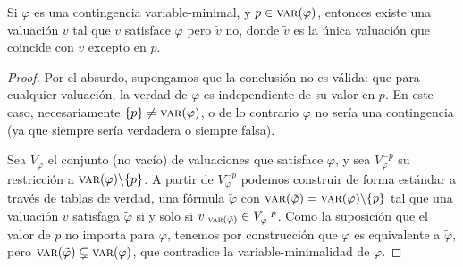 \begin{lemma} \label{lemma:variableMinimalProp}
Si $\varphi$ es una contingencia variable-minimal, y $p \in \textsc{var}(\varphi)$, entonces existe una valuación $v$ tal que $v$ satisface $\varphi$ pero $\tilde{v}$ no, donde $\tilde{v}$ es la única valuación que coincide con $v$ excepto en $p$.
\end{lemma}
\begin{proof}

Por el absurdo, supongamos que la conclusión no es válida: que para cualquier valuación, la verdad de $ \varphi $ es independiente de su valor en $ p $. En este caso, necesariamente $ \{p \} \neq \textsc{var}(\varphi) $, o de lo contrario $ \varphi $ no sería una contingencia (ya que siempre sería verdadera o siempre falsa).

Sea $V_\varphi$ el conjunto (no vacío) de valuaciones que satisface $\varphi$, y sea $V^{-p}_\varphi$ su restricción a $\textsc{var}(\varphi) \backslash\{p\}$. A partir de $V^{-p}_\varphi$ podemos construir de forma estándar a través de tablas de verdad, una fórmula $\tilde{\varphi}$ con $\textsc{var}(\tilde{\varphi}) = \textsc{var}(\varphi) \backslash\{p\}$ tal que una valuación $v$ satisfaga $\tilde{\varphi}$ si y solo si $v|_{ \textsc{var}(\tilde{\varphi})} \in V^{-p}_\varphi$. Como la suposición que el valor de $p$ no importa para $\varphi$, tenemos por construcción que $\varphi$ es equivalente a $\tilde{\varphi}$, pero $\textsc{var}(\tilde{\varphi}) \subsetneq \textsc{var}(\varphi)$, que contradice la variable-minimalidad de $\varphi$.
\end{proof}


